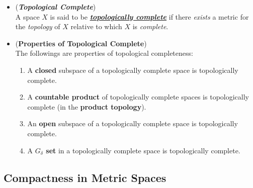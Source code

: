 \documentclass[11pt]{article}
\begin{document}
\begin{itemize}
\item \begin{definition} (\emph{\textbf{Topological Complete}})\\
A space $X$ is said to be \underline{\emph{\textbf{topologically complete}}} if there \emph{exists} a metric for the \emph{topology} of $X$ relative to which $X$ is \emph{complete}.
\end{definition}

\item \begin{proposition} (\textbf{Properties of Topological Complete}) \citep{munkres2000topology}\\
The followings are properties of topological completeness:
\begin{enumerate}
\item A \textbf{closed} subspace of a topologically complete space is topologically complete.
\item A \textbf{countable product} of topologically complete spaces is topologically complete (in the \textbf{product topology}).
\item An \textbf{open} subspace of a topologically complete space is topologically complete.
\item A \textbf{$G_{\delta}$ set} in a topologically complete space is topologically complete. 
\end{enumerate}
\end{proposition}
\end{itemize}

\subsection{Compactness in Metric Spaces}
\end{document}
